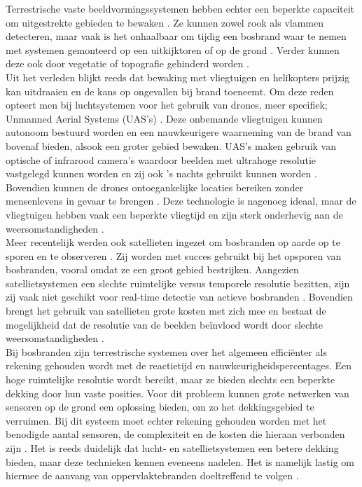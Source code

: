 \documentclass{hogent-article}
\begin{document}
Terrestrische vaste beeldvormingssystemen hebben echter een beperkte capaciteit om uitgestrekte gebieden te bewaken \autocite{Cruz2016}. Ze kunnen zowel rook als vlammen detecteren, maar vaak is het onhaalbaar om tijdig een bosbrand waar te nemen met systemen gemonteerd op een uitkijktoren of op de grond \autocite{Barmpoutis2020}. Verder kunnen deze ook door vegetatie of topografie gehinderd worden \autocite{Breejen2001}. \\

Uit het verleden blijkt reeds dat bewaking met vliegtuigen en helikopters prijzig kan uitdraaien en de kans op ongevallen bij brand toeneemt. Om deze reden opteert men bij luchtsystemen voor het gebruik van drones, meer specifiek; Unmanned Aerial Systems (UAS’s) \autocite{Cruz2016}. Deze onbemande vliegtuigen kunnen autonoom bestuurd worden en een nauwkeurigere waarneming van de brand van bovenaf bieden, alsook een groter gebied bewaken. UAS’s maken gebruik van optische of infrarood camera’s waardoor beelden met ultrahoge resolutie vastgelegd kunnen worden en zij ook ’s nachts gebruikt kunnen worden \autocite{Cruz2016, Barmpoutis2020}. Bovendien kunnen de drones ontoegankelijke locaties bereiken zonder mensenlevens in gevaar te brengen \autocite{Cruz2016}. Deze technologie is nagenoeg ideaal, maar de vliegtuigen hebben vaak een beperkte vliegtijd en zijn sterk onderhevig aan de weersomstandigheden \autocite{Barmpoutis2020}.
\\

Meer recentelijk werden ook satellieten ingezet om bosbranden op aarde op te sporen en te observeren \autocite{Alkhatib2014, Barmpoutis2020}. Zij worden met succes gebruikt bij het opsporen van bosbranden, vooral omdat ze een groot gebied bestrijken. Aangezien satellietsystemen een slechte ruimtelijke versus temporele resolutie bezitten, zijn zij vaak niet geschikt voor real-time detectie van actieve bosbranden \autocite{Barmpoutis2020, Cruz2016}. 
Bovendien brengt het gebruik van satellieten grote kosten met zich mee en bestaat de mogelijkheid dat de resolutie van de beelden beïnvloed wordt door slechte weersomstandigheden
\autocite{Chowdary2018}.
\\

Bij bosbranden zijn terrestrische systemen over het algemeen efficiënter als rekening gehouden wordt met de reactietijd en nauwkeurigheidspercentages. Een hoge ruimtelijke resolutie wordt bereikt, maar ze bieden slechts een beperkte dekking door hun vaste posities. Voor dit probleem kunnen grote netwerken van sensoren op de grond een oplossing bieden, om zo het dekkingsgebied te verruimen. Bij dit systeem moet echter rekening gehouden worden met het benodigde aantal sensoren, de complexiteit en de kosten die hieraan verbonden zijn \autocite{Barmpoutis2020}. 
Het is reeds duidelijk dat lucht- en satellietsystemen een betere dekking bieden, maar deze technieken kennen eveneens nadelen. Het is namelijk lastig om hiermee de aanvang van  oppervlaktebranden doeltreffend te volgen \autocite{Alkhatib2014}.
\\
\end{document}
